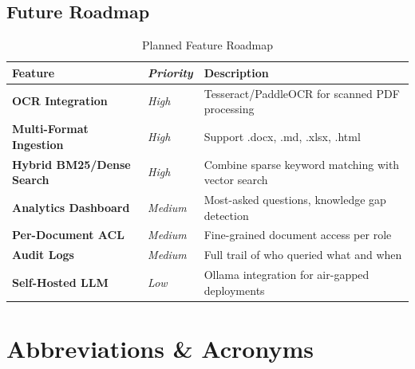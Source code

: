 \documentclass[12pt,a4paper]{report}
\begin{document}
\section{Future Roadmap}

\begin{table}[htbp]
\centering
\caption{Planned Feature Roadmap}
\renewcommand{\arraystretch}{1.4}
\begin{tabularx}{\linewidth}{>{\bfseries\sffamily}l >{\itshape}l X}
\toprule
\rowcolor{DeepRose!10}
Feature & Priority & Description \\
\midrule
OCR Integration           & High   & Tesseract/PaddleOCR for scanned PDF processing \\
Multi-Format Ingestion    & High   & Support .docx, .md, .xlsx, .html \\
Hybrid BM25/Dense Search  & High   & Combine sparse keyword matching with vector search \\
Analytics Dashboard       & Medium & Most-asked questions, knowledge gap detection \\
Per-Document ACL          & Medium & Fine-grained document access per role \\
Audit Logs                & Medium & Full trail of who queried what and when \\
Self-Hosted LLM           & Low    & Ollama integration for air-gapped deployments \\
\bottomrule
\end{tabularx}
\end{table}

\clearpage
\chapter*{Abbreviations \& Acronyms}
\end{document}
